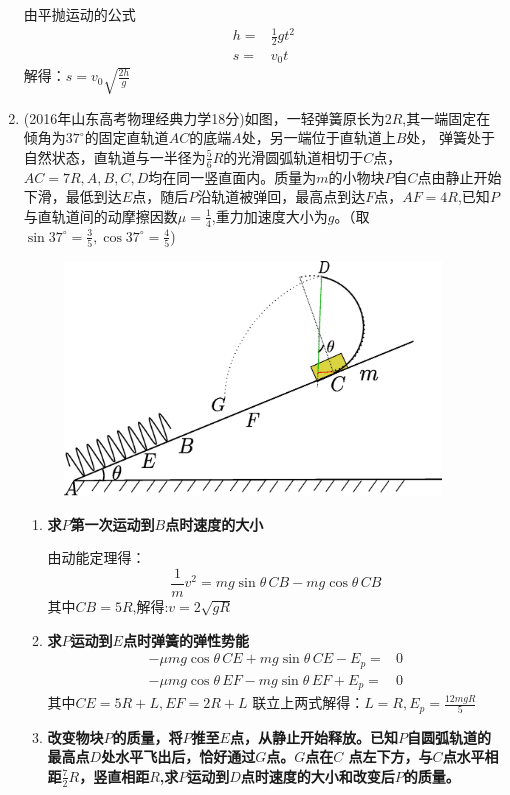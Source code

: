 \documentclass{article}
\begin{document}
\begin{enumerate}
由平抛运动的公式
\begin{align*}
h=&\frac{1}{2}gt^2\\
s=&v_0t
\end{align*}
解得：$s=v_0\sqrt{\frac{2h}{g}}$
\item (2016年山东高考物理经典力学18分)如图，一轻弹簧原长为$2R$,其一端固定在倾角为$37^{\circ}$的固定直轨道$AC$的底端$A$处，另一端位于直轨道上$B$处，
弹簧处于自然状态，直轨道与一半径为$\frac{5}{6}R$的光滑圆弧轨道相切于$C$点，$AC=7R,A,B,C,D$均在同一竖直面内。质量为$m$的小物块$P$自$C$点由静止开始下滑，最低到达$E$点，随后$P$沿轨道被弹回，最高点到达$F$点，$AF=4R$,已知$P$与直轨道间的动摩擦因数$\mu = \frac{1}{4}$,重力加速度大小为$g$。（取$\sin37^{\circ}=\frac{3}{5},\cos37^{\circ}=\frac{4}{5}$)
\begin{figure}[!ht]
\centering
\includegraphics[width=10cm]{2017physics.eps}
\caption{}\label{fig:2017physics}
\end{figure}
\begin{enumerate}[label=(\arabic*)]
\item \textbf{求$P$第一次运动到$B$点时速度的大小}

由动能定理得：
\[
\frac{1}{m}v^2=mg\sin\theta\,CB -mg\cos\theta\,CB
\]
其中$CB=5R$,解得:$v=2\sqrt{gR}$
\item \textbf{求$P$运动到$E$点时弹簧的弹性势能}
\begin{align*}
-\mu mg\cos\theta\, CE+mg\sin\theta \,CE-E_p= &0\\
-\mu mg \cos\theta \, EF-mg\sin\theta\,EF+E_p=& 0
\end{align*}
其中$CE=5R+L,EF=2R+L$
联立上两式解得：$L=R,E_p=\frac{12mgR}{5}$
\item \textbf{改变物块$P$的质量，将$P$推至$E$点，从静止开始释放。已知$P$自圆弧轨道的最高点$D$处水平飞出后，恰好通过$G$点。$G$点在$C$ 点左下方，与$C$点水平相距$\frac{7}{2}R$，竖直相距$R$,求$P$运动到$D$点时速度的大小和改变后$P$的质量。}


\end{enumerate}
\end{enumerate}
\end{document}
